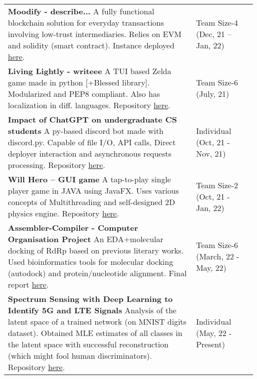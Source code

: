 \documentclass[10pt]{extarticle}
\begin{document}
\vspace{0pt}
\begin{contained}
\begin{longtable}{p{}p{}p{}}
    \textbf{Moodify - describe...}\newline
    A fully functional blockchain solution for everyday transactions
    involving low-trust intermediaries. Relies on EVM and solidity (smart contract).
    Instance deployed \href{https://macaroon.web.app/}{here}.
    &Team Size-4
    \newline (Dec, 21 – Jan, 22)\\
    \textbf{Living Lightly - writeee}\newline
    A TUI based Zelda game made in python [+Blessed library]. Modularized and PEP8 compliant. Also has localization in diff. languages. Repository \href{https://github.com/StephD/CJ8-blessed-badgers}{here}.
    &Team Size-6
    \newline (July, 21)\\
    \textbf{Impact of ChatGPT on undergraduate CS students}\newline
    A py-based discord bot made with discord.py. Capable of file I/O, API calls, Direct deployer interaction and asynchronous requests processing. Repository \href{https://github.com/Anindya-Prithvi/rerebot}{here}.
    &Individual
    \newline (Oct, 21 - Nov, 21)\\
    \textbf{Will Hero – GUI game}\newline
    A tap-to-play single player game in JAVA using JavaFX. Uses various
    concepts of Multithreading and self-designed 2D physics engine. Repository \href{https://github.com/vibsterD/CSE201-AP-Project}{here}.
    &Team Size-2
    \newline (Oct, 21 - Jan, 22)\\
    \textbf{Assembler-Compiler - Computer Organisation Project}\newline
    An EDA+molecular docking of RdRp based on previous literary works. Used
    bioinformatics tools for molecular docking (autodock) and protein/nucleotide
    alignment. Final report \href{https://anindya-prithvi.github.io/filehost/PB_Project.pdf}{here}.
    &Team Size-6
    \newline (March, 22 - May, 22)\\
    \textbf{Spectrum Sensing with Deep Learning to Identify 5G and LTE Signals}\newline
    Analysis of the latent space of a trained network (on MNIST digits dataset). Obtained MLE estimates of all classes in the latent space with successful reconstruction (which might fool human discriminators). Repository \href{https://github.com/Anindya-Prithvi/MNIST_CAELatentSpace}{here}.
    &Individual
    \newline (May, 22 - Present)\\
\end{longtable}
\end{contained}
\end{document}
